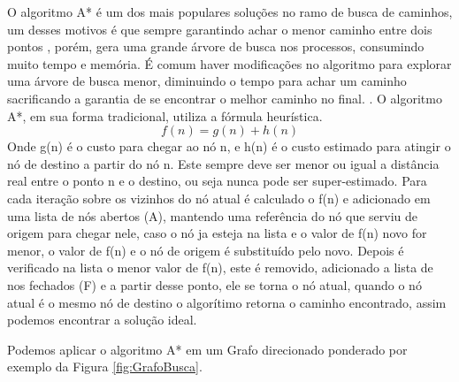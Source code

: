 O algoritmo A* é um dos mais populares soluções no ramo de busca de caminhos, um desses motivos é que sempre garantindo achar o menor caminho entre dois pontos \cite{PEHart}, porém,  gera uma grande árvore de busca nos processos, consumindo muito tempo e memória. É comum haver modificações no algoritmo para explorar uma árvore de busca menor, diminuindo o tempo para achar um caminho sacrificando a garantia de se encontrar o melhor caminho no final. \cite{Botea}.
O algoritmo A*, em sua forma tradicional, utiliza a fórmula heurística.
\[f(n) = g(n) + h(n)\]
Onde g(n) é o custo para chegar ao nó n, e h(n) é o custo estimado para atingir o nó de destino a partir do nó n. Este sempre deve ser menor ou igual a distância real entre o ponto n e o destino, ou seja nunca pode ser super-estimado. Para cada iteração sobre os vizinhos do nó atual é calculado o f(n) e adicionado em uma lista de nós abertos (A), mantendo uma referência do nó que serviu de origem para chegar nele, caso o nó ja esteja na lista e o valor de f(n) novo for menor, o valor de f(n) e o nó de origem é substituído pelo novo. Depois é verificado na lista o menor valor de f(n), este é removido, adicionado a lista de nos fechados (F) e a partir desse ponto, ele se torna o nó atual, quando o nó atual é o mesmo nó de destino o algorítimo retorna o caminho encontrado, assim podemos encontrar a solução ideal. \cite{PEHart} 

Podemos aplicar o algoritmo A* em um Grafo direcionado ponderado por exemplo da Figura \ref{fig:GrafoBusca}.

\begin{minipage}{\linewidth}
    \label{fig:GrafoBusca}
\end{minipage}

